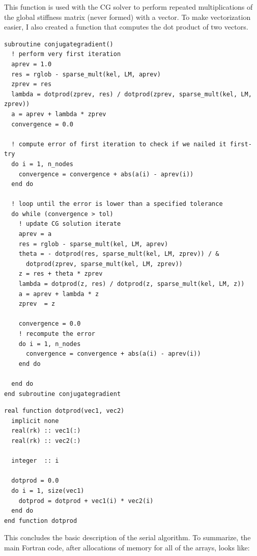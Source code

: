\documentclass[10pt]{article}
\begin{document}
This function is used with the CG solver to perform repeated multiplications of the global stiffness matrix (never formed) with a vector. To make vectorization easier, I also created a function that computes the dot product of two vectors. 

\begin{lstlisting}
subroutine conjugategradient()
  ! perform very first iteration
  aprev = 1.0
  res = rglob - sparse_mult(kel, LM, aprev)
  zprev = res
  lambda = dotprod(zprev, res) / dotprod(zprev, sparse_mult(kel, LM, zprev))
  a = aprev + lambda * zprev
  convergence = 0.0

  ! compute error of first iteration to check if we nailed it first-try
  do i = 1, n_nodes
    convergence = convergence + abs(a(i) - aprev(i))
  end do

  ! loop until the error is lower than a specified tolerance
  do while (convergence > tol)
    ! update CG solution iterate
    aprev = a
    res = rglob - sparse_mult(kel, LM, aprev)
    theta = - dotprod(res, sparse_mult(kel, LM, zprev)) / &
      dotprod(zprev, sparse_mult(kel, LM, zprev))
    z = res + theta * zprev
    lambda = dotprod(z, res) / dotprod(z, sparse_mult(kel, LM, z))
    a = aprev + lambda * z
    zprev  = z

    convergence = 0.0
    ! recompute the error
    do i = 1, n_nodes
      convergence = convergence + abs(a(i) - aprev(i))
    end do

  end do
end subroutine conjugategradient
\end{lstlisting}

\begin{lstlisting}
real function dotprod(vec1, vec2)
  implicit none
  real(rk) :: vec1(:)
  real(rk) :: vec2(:)

  integer  :: i

  dotprod = 0.0
  do i = 1, size(vec1)
    dotprod = dotprod + vec1(i) * vec2(i)
  end do
end function dotprod
\end{lstlisting}

This concludes the basic description of the serial algorithm. To summarize, the main Fortran code, after allocations of memory for all of the arrays, looks like:
\end{document}

